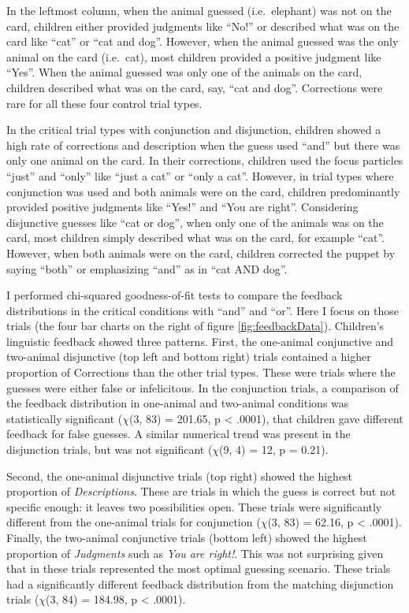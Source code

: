 \documentclass[oneside]{report}
\theoremstyle{definition}
\theoremstyle{definition}
\theoremstyle{definition}
\theoremstyle{remark}
\begin{document}
In the leftmost column, when the animal guessed (i.e.~elephant) was not
on the card, children either provided judgments like ``No!'' or
described what was on the card like ``cat'' or ``cat and dog''. However,
when the animal guessed was the only animal on the card (i.e.~cat), most
children provided a positive judgment like ``Yes''. When the animal
guessed was only one of the animals on the card, children described what
was on the card, say, ``cat and dog''. Corrections were rare for all
these four control trial types.

In the critical trial types with conjunction and disjunction, children
showed a high rate of corrections and description when the guess used
``and'' but there was only one animal on the card. In their corrections,
children used the focus particles ``just'' and ``only'' like ``just a
cat'' or ``only a cat''. However, in trial types where conjunction was
used and both animals were on the card, children predominantly provided
positive judgments like ``Yes!'' and ``You are right''. Considering
disjunctive guesses like ``cat or dog'', when only one of the animals
was on the card, most children simply described what was on the card,
for example ``cat''. However, when both animals were on the card,
children corrected the puppet by saying ``both'' or emphasizing ``and''
as in ``cat AND dog''.

I performed chi-squared goodness-of-fit tests to compare the feedback
distributions in the critical conditions with ``and'' and ``or''. Here I
focus on those trials (the four bar charts on the right of figure
\ref{fig:feedbackData}). Children's linguistic feedback showed three
patterns. First, the one-animal conjunctive and two-animal disjunctive
(top left and bottom right) trials contained a higher proportion of
Corrections than the other trial types. These were trials where the
guesses were either false or infelicitous. In the conjunction trials, a
comparison of the feedback distribution in one-animal and two-animal
conditions was statistically significant (\(\chi\)(3, 83) = 201.65, p
\textless{} .0001), that children gave different feedback for false
guesses. A similar numerical trend was present in the disjunction
trials, but was not significant (\(\chi\)(9, 4) = 12, p = 0.21).

Second, the one-animal disjunctive trials (top right) showed the highest
proportion of \emph{Descriptions}. These are trials in which the guess
is correct but not specific enough: it leaves two possibilities open.
These trials were significantly different from the one-animal trials for
conjunction (\(\chi\)(3, 83) = 62.16, p \textless{} .0001). Finally, the
two-animal conjunctive trials (bottom left) showed the highest
proportion of \emph{Judgments} such as \emph{You are right!}. This was
not surprising given that in these trials represented the most optimal
guessing scenario. These trials had a significantly different feedback
distribution from the matching disjunction trials (\(\chi\)(3, 84) =
184.98, p \textless{} .0001).
\end{document}

